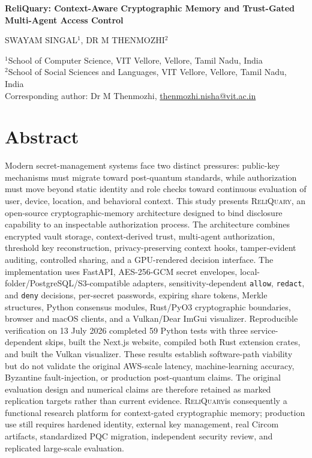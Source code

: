 \documentclass[10pt]{article}
\newcommand{\system}{\textsc{ReliQuary}}
\begin{document}
\begin{center}
{\Large\bfseries ReliQuary: Context-Aware Cryptographic Memory and Trust-Gated Multi-Agent Access Control\par}
\vspace{1.1em}
{\large SWAYAM SINGAL$^{1}$, DR M THENMOZHI$^{2}$\par}
\vspace{0.7em}
{\small
$^{1}$School of Computer Science, VIT Vellore, Vellore, Tamil Nadu, India\\
$^{2}$School of Social Sciences and Languages, VIT Vellore, Vellore, Tamil Nadu, India\\
Corresponding author: Dr M Thenmozhi, \href{mailto:thenmozhi.nisha@vit.ac.in}{thenmozhi.nisha@vit.ac.in}
}
\end{center}

\section*{Abstract}

Modern secret-management systems face two distinct pressures: public-key mechanisms must migrate toward post-quantum standards, while authorization must move beyond static identity and role checks toward continuous evaluation of user, device, location, and behavioral context. This study presents \system, an open-source cryptographic-memory architecture designed to bind disclosure capability to an inspectable authorization process. The architecture combines encrypted vault storage, context-derived trust, multi-agent authorization, threshold key reconstruction, privacy-preserving context hooks, tamper-evident auditing, controlled sharing, and a GPU-rendered decision interface. The implementation uses FastAPI, AES-256-GCM secret envelopes, local-folder/PostgreSQL/S3-compatible adapters, sensitivity-dependent \texttt{allow}, \texttt{redact}, and \texttt{deny} decisions, per-secret passwords, expiring share tokens, Merkle structures, Python consensus modules, Rust/PyO3 cryptographic boundaries, browser and macOS clients, and a Vulkan/Dear ImGui visualizer. Reproducible verification on 13 July 2026 completed 59 Python tests with three service-dependent skips, built the Next.js website, compiled both Rust extension crates, and built the Vulkan visualizer. These results establish software-path viability but do not validate the original AWS-scale latency, machine-learning accuracy, Byzantine fault-injection, or production post-quantum claims. The original evaluation design and numerical claims are therefore retained as marked replication targets rather than current evidence. \system is consequently a functional research platform for context-gated cryptographic memory; production use still requires hardened identity, external key management, real Circom artifacts, standardized PQC migration, independent security review, and replicated large-scale evaluation.
\end{document}
